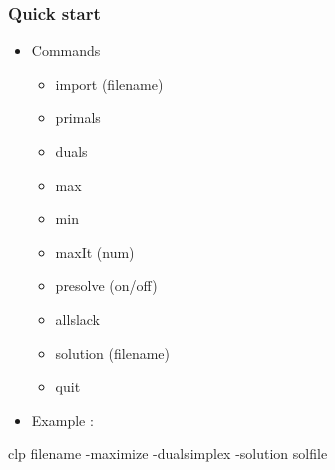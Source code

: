 \documentclass{beamer}
\begin{document}
\begin{frame}
\frametitle{Quick start}
\begin{itemize}
\item Commands
\begin{itemize}
\item import (filename)
\item primals
\item duals
\item max
\item min
\item maxIt (num)
\item presolve (on/off)
\item allslack
\item solution (filename)
\item quit
\end{itemize}
\end{itemize}
\begin{itemize}
\item Example :
\end{itemize}
clp filename -maximize -dualsimplex -solution solfile
\end{frame}

\end{document}
